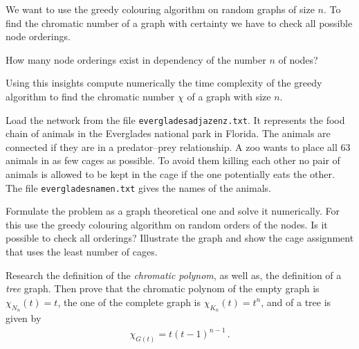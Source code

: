    
		
		
		\subexercise[%
  topic=Time Complexity of the Greedy Colouring Algorithm,
    ]

We want to use the greedy colouring algorithm on random graphs of size $n$. To find the chromatic number of a graph with certainty we have to check all possible node orderings. 

How many node orderings exist in dependency of the number $n$ of nodes? 

Using this insights compute numerically the time complexity of the greedy algorithm to find the chromatic number $\chi$ of a graph with size $n$.


\exercise[%
  topic=Placing Animals in Cages ,
    ]



Load the network from the file  {\tt everglades\textunderscore adjazenz.txt}. It represents the food chain of animals in the Everglades national park in Florida. The animals are connected if they are in a predator--prey relationship. A zoo wants to place all $63$ animals in as few cages as possible. To avoid them killing each other no pair of animals is allowed to be kept in the cage if the one potentially eats the other. The file  {\tt everglades\textunderscore namen.txt} gives the names of the animals.

Formulate the problem as a graph theoretical one and solve it numerically. For this use the greedy colouring algorithm on random orders of the nodes. Is it possible to check all orderings? Illustrate the graph and show the cage assignment that uses the least number of cages.

\exercise[%
  topic=Chromatic Polynom,
    ]

Research the definition of the \emph{chromatic polynom}, as well as, the definition of a \emph{tree} graph. Then prove that the chromatic polynom of the empty graph is $\chi_{N_n}(t) =t$, the one of the complete graph is $\chi_{K_n}(t) =t^n$, and of a tree is given by
\begin{align}
\chi_{G(t)} = t(t-1)^{n-1}\,.
\end{align}

 


	

